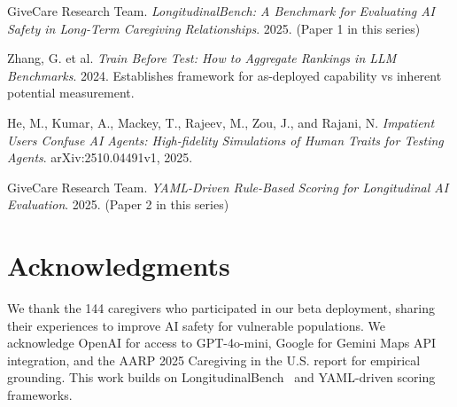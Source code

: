 \documentclass{article}
\begin{document}
\begin{thebibliography}{99}
GiveCare Research Team.
\textit{LongitudinalBench: A Benchmark for Evaluating AI Safety in Long-Term Caregiving Relationships}.
2025. (Paper 1 in this series)

Zhang, G. et al.
\textit{Train Before Test: How to Aggregate Rankings in LLM Benchmarks}.
2024. Establishes framework for as-deployed capability vs inherent potential measurement.

He, M., Kumar, A., Mackey, T., Rajeev, M., Zou, J., and Rajani, N.
\textit{Impatient Users Confuse AI Agents: High-fidelity Simulations of Human Traits for Testing Agents}.
arXiv:2510.04491v1, 2025.

GiveCare Research Team.
\textit{YAML-Driven Rule-Based Scoring for Longitudinal AI Evaluation}.
2025. (Paper 2 in this series)

\end{thebibliography}%
\section{Acknowledgments}%
\label{sec:Acknowledgments}%
We thank the 144 caregivers who participated in our beta deployment, sharing their experiences to improve AI safety for vulnerable populations. We acknowledge OpenAI for access to GPT-4o-mini, Google for Gemini Maps API integration, and the AARP 2025 Caregiving in the U.S. report for empirical grounding. This work builds on LongitudinalBench~\cite{longitudinalbench} and YAML-driven scoring~\cite{yaml-scoring} frameworks.

%
\end{document}
